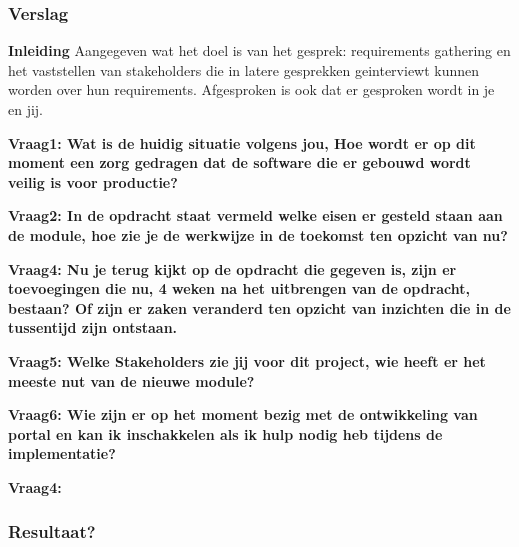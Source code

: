 \subsubsection{Verslag}
\textbf{Inleiding}
Aangegeven wat het doel is van het gesprek: requirements gathering en het vaststellen van stakeholders die in latere gesprekken geinterviewt kunnen worden over hun requirements. Afgesproken is ook dat er gesproken wordt in je en jij.

\bigskip

\textbf{Vraag1: Wat is de huidig situatie volgens jou, Hoe wordt er op dit moment een zorg gedragen dat de software die er gebouwd wordt veilig is voor productie?}

\lipsum[01]
\bigskip

\textbf{Vraag2: In de opdracht staat vermeld welke eisen er gesteld staan aan de module, hoe zie je de werkwijze in de toekomst ten opzicht van nu?}

\lipsum[03]
\bigskip

\textbf{Vraag4: Nu je terug kijkt op de opdracht die gegeven is, zijn er toevoegingen die nu, 4 weken na het uitbrengen van de opdracht, bestaan? Of zijn er zaken veranderd ten opzicht van inzichten die in de tussentijd zijn ontstaan.}

\lipsum[05]
\bigskip

\textbf{Vraag5: Welke Stakeholders zie jij voor dit project, wie heeft er het meeste nut van de nieuwe module? }

\lipsum[06]
\bigskip

\textbf{Vraag6: Wie zijn er op het moment bezig met de ontwikkeling van portal en kan ik inschakkelen als ik hulp nodig heb tijdens de implementatie?}

\lipsum[09]
\bigskip

\textbf{Vraag4: }

\lipsum[07]

\subsubsection{Resultaat?}
